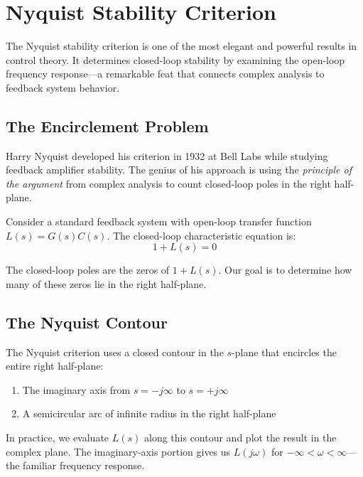 \section{Nyquist Stability Criterion}
\label{sec:nyquist}

The Nyquist stability criterion is one of the most elegant and powerful results in control theory. It determines closed-loop stability by examining the open-loop frequency response---a remarkable feat that connects complex analysis to feedback system behavior.

\subsection{The Encirclement Problem}

Harry Nyquist developed his criterion in 1932 at Bell Labs while studying feedback amplifier stability. The genius of his approach is using the \textit{principle of the argument} from complex analysis to count closed-loop poles in the right half-plane.

Consider a standard feedback system with open-loop transfer function $L(s) = G(s)C(s)$. The closed-loop characteristic equation is:
\begin{equation}
1 + L(s) = 0
\end{equation}

The closed-loop poles are the zeros of $1 + L(s)$. Our goal is to determine how many of these zeros lie in the right half-plane.

\subsection{The Nyquist Contour}

The Nyquist criterion uses a closed contour in the $s$-plane that encircles the entire right half-plane:

\begin{enumerate}
    \item The imaginary axis from $s = -j\infty$ to $s = +j\infty$
    \item A semicircular arc of infinite radius in the right half-plane
\end{enumerate}

In practice, we evaluate $L(s)$ along this contour and plot the result in the complex plane. The imaginary-axis portion gives us $L(j\omega)$ for $-\infty < \omega < \infty$---the familiar frequency response.

